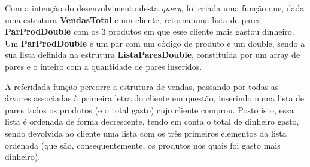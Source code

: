 \documentclass{article}
\begin{document}
\par\noindent\hspace{0.52cm}Com a intenção do desenvolvimento desta \textit{query}, foi criada uma função que, dada uma estrutura \textbf{VendasTotal} e um cliente, retorna uma lista de pares \textbf{ParProdDouble} com os 3 produtos em que esse cliente mais gastou dinheiro. Um \textbf{ParProdDouble} é um par com um código de produto e um double, sendo a sua lista definida na estrutura \textbf{ListaParesDouble}, constituída por um array de pares e o inteiro com a quantidade de pares inseridos.
\par A referidada função percorre a estrutura de vendas, passando por todas as árvores associadas à primeira letra do cliente em questão, inserindo numa lista de pares todos os produtos (e o total gasto) cujo cliente comprou. Posto isto, essa lista é ordenada de forma decrescente, tendo em conta o total de dinheiro gasto, sendo devolvida ao cliente uma lista com os três primeiros elementos da lista ordenada (que são, consequentemente, os produtos nos quais foi gasto mais dinheiro).
\end{document}

